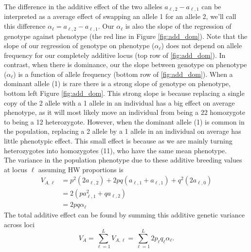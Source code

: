 The difference in the additive effect of the two alleles $a_{\ell, 2}-a_{\ell,
1}$ can be interpreted as a average effect of swapping an allele 1 for an
allele 2, we'll call this difference $\alpha_{\ell}=a_{\ell, 2}-a_{\ell, 1}$.
Our $\alpha_{\ell}$ is also the slope of the regression of genotype against
phenotype (the red line in Figure \ref{fig:add_dom}). Note that the slope of
our regression of genotype on phenotype ($\alpha_{\ell}$) does not depend on
allele frequency for our completely additive locus (top row of
\ref{fig:add_dom}). In contrast, when there is dominance, our the slope between
genotype on phenotype ($\alpha_{\ell}$) is a function of allele frequency
(bottom row of \ref{fig:add_dom}). When a dominant allele (1) is rare there is
a strong slope of genotype on phenotype, bottom left Figure \ref{fig:add_dom}.
This strong slope is because replacing a single copy of the 2 allele with a 1
allele in an individual has a big effect on average phenotype, as it will most
likely move an individual from being a 22 homozygote to being a 12
heterozygote. However, when the dominant allele (1) is common in the
population, replacing a 2 allele by a 1 allele in an individual on average has
little phenotypic effect. This small effect is because as we are mainly turning
heterozygotes into homozygotes (11), who have the same mean phenotype.  \\

The variance in the population phenotype due to these
additive breeding values at locus $\ell$ assuming HW proportions is
\begin{align}
V_{A, \ell} &= p^2 (2a_{\ell,2}) + 2pq (a_{\ell,1}+a_{\ell,1}) + q^2
(2a_{\ell,0}) \nonumber \\
& = 2(p a_{\ell, 1} ^2 + q a_{\ell, 2} ) \nonumber \\
& = 2pq \alpha_{\ell}
\end{align}
The total additive effect can
be found by summing this additive genetic variance across loci
\begin{equation}
V_A = \sum_{\ell=1}^{L} V_{A, \ell} = \sum_{\ell=1}^{L}
2p_{\ell}q_{\ell} \alpha_{\ell}.
\end{equation}


